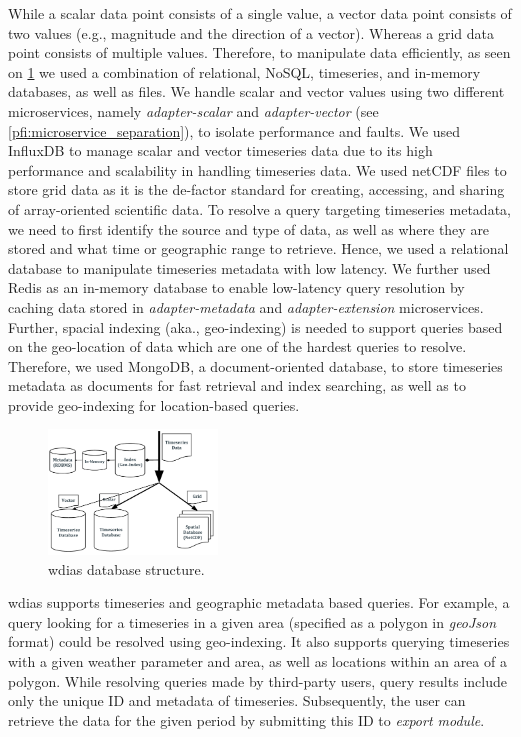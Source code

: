 \documentclass[conference]{IEEEtran}
\begin{document}
While a scalar data point consists of a single value, a vector data point consists of two values (e.g., magnitude and the direction of a vector). Whereas a grid data point consists of multiple values. Therefore, to manipulate data efficiently, as seen on \cref{pfi:database_structure} we used a combination of relational, NoSQL, timeseries, and in-memory databases, as well as files. We handle scalar and vector values using two different microservices, namely \textit{adapter-scalar} and \textit{adapter-vector} (see \cref{pfi:microservice_separation}), to isolate performance and faults. We used InfluxDB to manage scalar and vector timeseries data due to its high performance and scalability in handling timeseries data. We used \acrshort{netCDF} files to store grid data as it is the de-factor standard for creating, accessing, and sharing of array-oriented scientific data. To resolve a query targeting timeseries metadata, we need to first identify the source and type of data, as well as where they are stored and what time or geographic range to retrieve. Hence, we used a relational database to manipulate timeseries metadata with low latency. We further used Redis as an in-memory database to enable low-latency query resolution by caching data stored in \textit{adapter-metadata} and \textit{adapter-extension} microservices. Further, spacial indexing (aka., geo-indexing) is needed to support queries based on the geo-location of data which are one of the hardest queries to resolve. Therefore, we used MongoDB, a document-oriented database, to store timeseries metadata as documents for fast retrieval and index searching, as well as to provide geo-indexing for location-based queries.

\begin{figure}[!tb]
\centerline{\includegraphics[width=0.4\textwidth]{images/wdias_database_structure_p1.pdf}}
\caption{\acrshort{wdias} database structure.}
\label{pfi:database_structure}
\end{figure}

\acrshort{wdias} supports timeseries and geographic metadata based queries. For example, a query looking for a timeseries in a given area (specified as a polygon in \emph{geoJson} \cite{InternetEngineeringTaskForceGeoJSON} format) could be resolved using geo-indexing. It also supports querying timeseries with a given weather parameter and area, as well as locations within an area of a polygon. While resolving queries made by third-party users, query results include only the unique ID and metadata of timeseries. Subsequently, the user can retrieve the data for the given period by submitting this ID to \emph{export module}.
\end{document}
